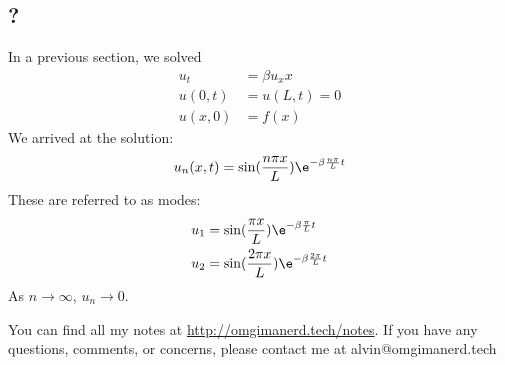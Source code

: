 \documentclass{math}
\begin{document}
\subsection*{?}
In a previous section, we solved
\begin{align*}
  u_t &= \beta u_xx \\
  u(0,t) &= u(L,t) = 0 \\
  u(x,0) &= f(x)
\end{align*}
We arrived at the solution:
\[ u_n(x,t) = \sin(\frac{n\pi x}{L})\e^{-\beta\frac{n\pi}{L}t} \]
These are referred to as modes:
\begin{align*}
  u_1 &= \sin(\frac{\pi x}{L})\e^{-\beta\frac{\pi}{L}t} \\
  u_2 &= \sin(\frac{2\pi x}{L})\e^{-\beta\frac{2\pi}{L}t}
\end{align*}
As \( n\to\infty \), \( u_n \to 0 \).


\begin{center}
  You can find all my notes at \url{http://omgimanerd.tech/notes}. If you have
  any questions, comments, or concerns, please contact me at
  alvin@omgimanerd.tech
\end{center}
\end{document}
